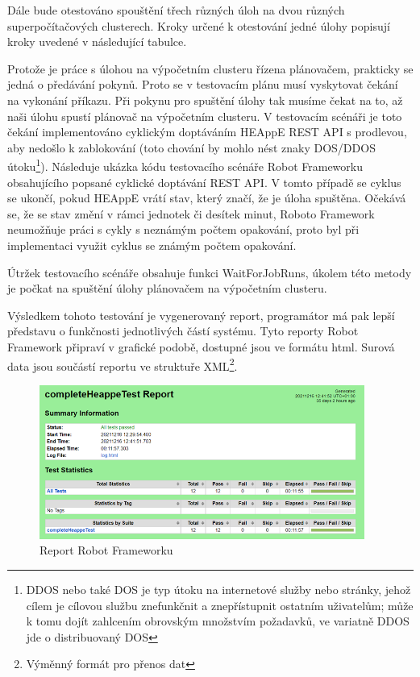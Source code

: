 Dále bude otestováno spouštění třech různých úloh na dvou různých superpočítačových clusterech. Kroky určené k otestování jedné úlohy popisují kroky uvedené v následující tabulce.


Protože je práce s úlohou na výpočetním clusteru řízena plánovačem, prakticky se jedná o předávání pokynů. Proto se v testovacím plánu musí vyskytovat čekání na vykonání příkazu. Při pokynu pro spuštění úlohy tak musíme čekat na to, až naši úlohu spustí plánovač na výpočetním clusteru. V testovacím scénáři je toto čekání implementováno cyklickým doptáváním HEAppE REST API s prodlevou, aby nedošlo k zablokování (toto chování by mohlo nést znaky DOS/DDOS útoku\footnote{DDOS nebo také DOS je typ útoku na internetové služby nebo stránky, jehož cílem je cílovou službu znefunkčnit a znepřístupnit ostatním uživatelům; může k tomu dojít zahlcením obrovským množstvím požadavků, ve variatně DDOS jde o distribuovaný DOS\cite{UUBpn6UTaV8mOipc}}). Následuje ukázka kódu testovacího scénáře Robot Frameworku obsahujícího popsané cyklické doptávání REST API. V tomto případě se cyklus se ukončí, pokud HEAppE vrátí stav, který značí, že je úloha spuštěna. Očekává se, že se stav změní v rámci jednotek či desítek minut, Roboto Framework neumožňuje práci s cykly s neznámým počtem opakování, proto byl při implementaci využit cyklus se známým počtem opakování.

Útržek testovacího scénáře obsahuje funkci WaitForJobRuns, úkolem této metody je počkat na spuštění úlohy plánovačem na výpočetním clusteru.

\newpage


Výsledkem tohoto testování je vygenerovaný report, programátor má pak lepší představu o funkčnosti jednotlivých částí systému. Tyto reporty Robot Framework připraví v grafické podobě, dostupné jsou ve formátu html. Surová data jsou součástí reportu ve struktuře XML\footnote{Výměnný formát pro přenos dat}.



\begin{figure}[h]
	\centering
	\includegraphics[width=0.95\textwidth]{Figures/report-small.png}
	\caption{Report Robot Frameworku}
	\label{fig:WritingThesis}
\end{figure}

